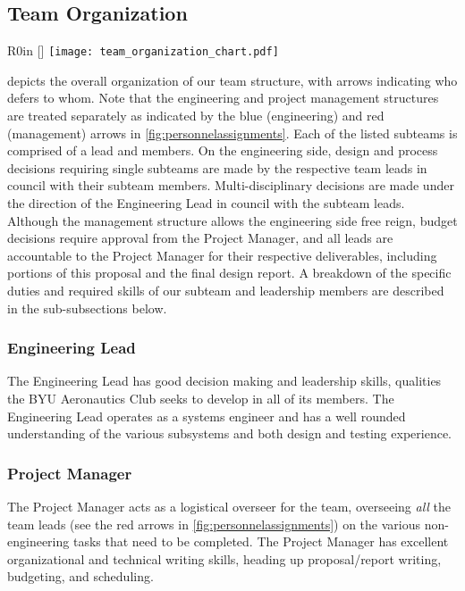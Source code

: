 \subsection{Team Organization}
\label{ssec:TeamOrganization}

\begin{wrapfigure}[8]{R}{0in}
	\centering
	\raisebox{0pt}[\dimexpr{}\baselineskip\relax]{
		\texttt{[image: team\_organization\_chart.pdf]}}
	\caption{BYU DBF Team Leadership Organization}
	\label{fig:personnelassignments}
\end{wrapfigure}

 depicts the overall organization of our team structure, with arrows indicating who defers to whom. 
Note that the engineering and project management structures are treated separately as indicated by the blue (engineering) and red (management) arrows in \cref{fig:personnelassignments}. 
Each of the listed subteams is comprised of a lead and members.
On the engineering side, design and process decisions requiring single subteams are made by the respective team leads in council with their subteam members.
Multi-disciplinary decisions are made under the direction of the Engineering Lead in council with the subteam leads.
Although the management structure allows the engineering side free reign, budget decisions require approval from the Project Manager, and all leads are accountable to the Project Manager for their respective deliverables, including portions of this proposal and the final design report.
A breakdown of the specific duties and required skills of our subteam and leadership members are described in the sub-subsections below.

\subsubsection{Engineering Lead} The Engineering Lead has good decision making and leadership skills, qualities the BYU Aeronautics Club seeks to develop in all of its members. 
The Engineering Lead operates as a systems engineer and has a well rounded understanding of the various subsystems and both design and testing experience.
\subsubsection{Project Manager} The Project Manager acts as a logistical overseer for the team, overseeing \textit{all} the team leads (see the red arrows in \cref{fig:personnelassignments}) on the various non-engineering tasks that need to be completed. The Project Manager has excellent organizational and technical writing skills, heading up proposal/report writing, budgeting, and scheduling.
